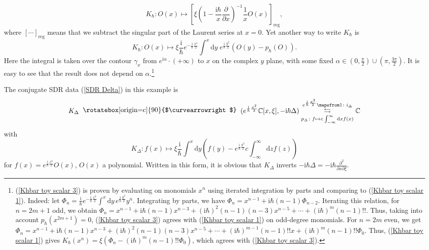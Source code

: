 \documentclass{amsart}
\theoremstyle{plain} %
\theoremstyle{definition}
\theoremstyle{remark}
\newcommand{\mr}{\mathrm}
\newcommand{\CC}{\mathbb{C}}
\newcommand{\dd}{\partial}
\newcommand{\iii}{\mathrm{i}}
\newcommand{\SDR}[5]{#5\;\;\raisebox{1.3pt}{\rotatebox[origin=c]{90}{$\curvearrowright$}}\;\; #1 \underset{#4}{\stackrel{#3}{\leftrightarrows}} #2}  %
\newcommand{\dr}{\mathrm{d}}
\begin{document}
    \begin{equation}\label{Khbar toy scalar 2}
        K_\hbar\colon O(x) \mapsto \left[\xi \left(1-\frac{\iii\hbar}{x}\frac{\dd}{\dd x}\right)^{-1}\frac{1}{x}O(x)\right]_\mr{reg},
    \end{equation}
    where $[\cdots]_\mr{reg}$ means that we subtract the singular part of the Laurent series at $x=0$.
    Yet another way to write $K_\hbar$ is
    \begin{equation}\label{Khbar toy scalar 3}
        K_\hbar\colon O(x) \mapsto
        \xi \frac{\iii}{\hbar}e^{-\frac{\iii}{\hbar}\frac{x^2}{2}}\int^x %
        \dr y\; e^{\frac{\iii}{\hbar}\frac{y^2}{2}}(O(y)-p_\hbar(O)).
    \end{equation}
    Here the integral is taken over the contour
    $\gamma_x$ from $e^{\iii\alpha}\cdot(+\infty)$ 
    to $x$ on the complex $y$ plane, with some fixed $\alpha\in (0,\frac{\pi}{2})\cup (\pi,\frac{3\pi}{2})$. It is easy to see that the result does not depend on $\alpha$.\footnote{
    (\ref{Khbar toy scalar 3}) is proven by evaluating on monomials $x^n$ using iterated integration by parts and comparing to (\ref{Khbar toy scalar 1}). Indeed: let $\Phi_n=\frac{\iii}{\hbar} e^{-\frac{\iii}{\hbar}\frac{x^2}{2}} \int^x %
    \dr y\, e^{\frac{\iii}{\hbar}\frac{y^2}{2}} y^n$. Integrating by parts, we have $\Phi_n=x^{n-1}+\iii\hbar(n-1)\Phi_{n-2}$. Iterating this relation, for $n=2m+1$ odd, we obtain
    $\Phi_n=x^{n-1}+\iii\hbar(n-1) x^{n-3}+(\iii\hbar)^2 (n-1)(n-3) x^{n-5}+\cdots+ (\iii\hbar)^m (n-1)!!$. Thus, taking into account $p_\hbar(x^{2m+1})=0$, (\ref{Khbar toy scalar 3}) agrees with (\ref{Khbar toy scalar 1}) on odd-degree monomials. For $n=2m$ even, we get $\Phi_n=x^{n-1}+\iii\hbar(n-1) x^{n-3}+(\iii\hbar)^2 (n-1)(n-3) x^{n-5}+\cdots+(\iii\hbar)^{m-1}(n-1)!!x+(\iii\hbar)^m (n-1)!! \Phi_0$.
    Thus, (\ref{Khbar toy scalar 1}) gives $K_\hbar(x^n)=\xi (\Phi_n-(\iii\hbar)^m (n-1)!!\Phi_0)$, which agrees with (\ref{Khbar toy scalar 3}).
    }

    The conjugate SDR data (\ref{SDR Delta}) in this example is
    \begin{equation}
        \SDR{(e^{\frac{\iii}{\hbar}\frac{x^2}{2}}\CC[x,\xi],-\iii\hbar\Delta)}{\CC}{  e^{\frac{\iii}{\hbar}\frac{x^2}{2}}\mapsfrom 1\colon i_\Delta}{p_\Delta\colon f\mapsto c\int_{-\infty}^\infty \dr x f(x)}{K_\Delta}
    \end{equation}
    with
    \begin{equation}\label{K_Delta toy scalar}
        K_\Delta\colon f(x)\mapsto \xi \frac{\iii}{\hbar}\int^x \dr y\left(f(y)-e^{\frac{\iii}{\hbar}\frac{y^2}{2}}c\int_{-\infty}^\infty \dr z f(z)\right)
    \end{equation}
    for $f(x)=e^{\frac{\iii}{\hbar}\frac{x^2}{2}}O(x)$, $O(x)$ a polynomial. Written in this form, it is obvious that $K_\Delta$ inverts $-\iii\hbar\Delta = -\iii\hbar \frac{\dd^2}{\dd x\dd\xi}$.
\end{document}
